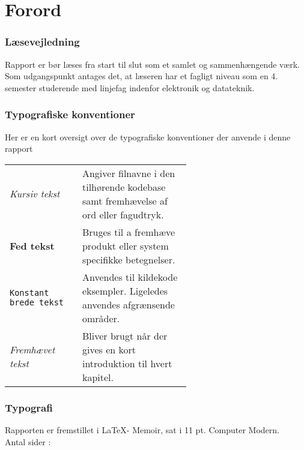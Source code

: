 \chapter*{Forord}\label{chap:forord}



\subsection{Læsevejledning}
Rapport er bør læses fra start til slut som et samlet og sammenhængende værk. 
Som udgangspunkt antages det, at læseren har et fagligt niveau som en 4. semester studerende med linjefag indenfor elektronik og datateknik.

\subsection{Typografiske konventioner}
Her er en kort oversigt over de typografiske konventioner der anvende i denne rapport\\
\begin{tabular}{l p{0.6\linewidth}}
	\textit{Kursiv tekst}			& Angiver filnavne i den tilhørende kodebase samt fremhævelse af ord eller fagudtryk. \\
	\textbf{Fed tekst}				& Bruges til a fremhæve produkt eller system specifikke betegnelser.\\
	\texttt{Konstant brede tekst}	& Anvendes til kildekode eksempler. Ligeledes anvendes afgrænsende områder.\\
	\emph{Fremhævet tekst}		    & Bliver brugt når der gives en kort introduktion til hvert kapitel.\\
\end{tabular}

\subsection{Typografi}
Rapporten er fremstillet i \LaTeX - Memoir, sat i 11 pt. Computer Modern.\\
Antal sider : \pageref{LastPage}